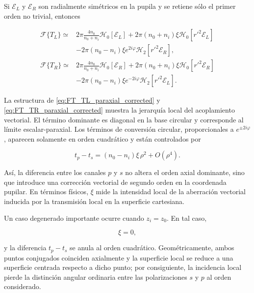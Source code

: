 Si \(\mathscr E_L\) y \(\mathscr E_R\) son radialmente simétricos en la pupila y se retiene sólo el primer orden no trivial, entonces

\begin{align}
\mathscr F\{T_L\}
\simeq{}&
2\pi
\frac{4n_0}{n_0+n_i}
\mathscr H_0[\mathscr E_L]
+
2\pi
(n_0+n_i)\xi
\mathscr H_0[r'^2\mathscr E_L]
\nonumber
\\[4pt]
&-
2\pi
(n_0-n_i)\xi
e^{2i\varphi}
\mathscr H_2[r'^2\mathscr E_R],
\label{eq:FT_TL_paraxial_corrected}
\\[10pt]
\mathscr F\{T_R\}
\simeq{}&
2\pi
\frac{4n_0}{n_0+n_i}
\mathscr H_0[\mathscr E_R]
+
2\pi
(n_0+n_i)\xi
\mathscr H_0[r'^2\mathscr E_R]
\nonumber
\\[4pt]
&-
2\pi
(n_0-n_i)\xi
e^{-2i\varphi}
\mathscr H_2[r'^2\mathscr E_L].
\label{eq:FT_TR_paraxial_corrected}
\end{align}

La estructura de \eqref{eq:FT_TL_paraxial_corrected} y \eqref{eq:FT_TR_paraxial_corrected} muestra la jerarquía local del acoplamiento vectorial. El término dominante es diagonal en la base circular y corresponde al límite escalar-paraxial. Los términos de conversión circular, proporcionales a \(e^{\pm2i\varphi}\), aparecen solamente en orden cuadrático y están controlados por

\begin{equation}
t_p-t_s
=
(n_0-n_i)\xi\,\rho^2
+
O(\rho^4).
\label{eq:polarization_conversion_quadratic_order}
\end{equation}

Así, la diferencia entre los canales \(p\) y \(s\) no altera el orden axial dominante, sino que introduce una corrección vectorial de segundo orden en la coordenada pupilar. En términos físicos, \(\xi\) mide la intensidad local de la aberración vectorial inducida por la transmisión local en la superficie cartesiana.

Un caso degenerado importante ocurre cuando \(z_i=z_0\). En tal caso,

\begin{equation}
\xi=0,
\label{eq:xi_zero_equal_conjugates}
\end{equation}

y la diferencia \(t_p-t_s\) se anula al orden cuadrático. Geométricamente, ambos puntos conjugados coinciden axialmente y la superficie local se reduce a una superficie centrada respecto a dicho punto; por consiguiente, la incidencia local pierde la distinción angular ordinaria entre las polarizaciones \(s\) y \(p\) al orden considerado.
